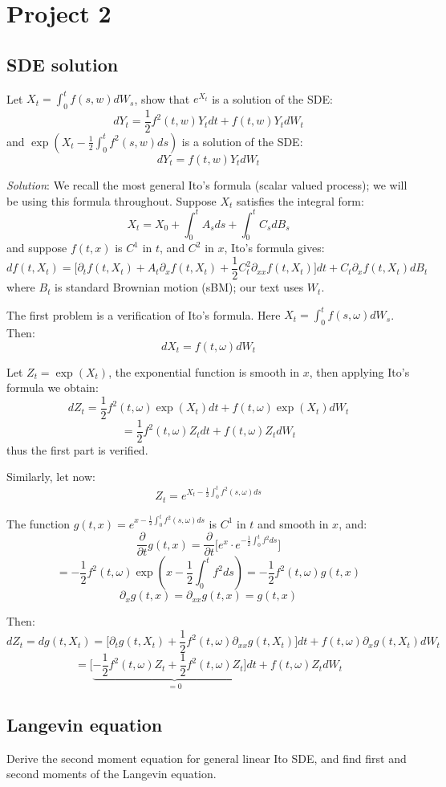 \documentclass{article}
\begin{document}
\section{Project 2}
\subsection{SDE solution} Let $X_t = \int_0^tf(s,w)dW_s$, show that $e^{X_t}$ is a solution of the SDE:
$$
    dY_t = \frac12f^2(t,w)Y_tdt + f(t,w)Y_tdW_t
$$ and $\exp(X_t - \frac12\int_0^tf^2(s,w)ds)$ is a solution of the SDE:
$$
    dY_t = f(t,w)Y_tdW_t
$$

\emph{Solution}: We recall the most general Ito's formula (scalar valued process); we will be using this formula throughout. Suppose $X_t$ satisfies the integral form:
$$
    X_t = X_0 + \int_0^tA_sds + \int_0^tC_sdB_s
$$ and suppose $f(t,x)$ is $C^1$ in $t$, and $C^2$ in $x$, Ito's formula gives:
$$
    df(t,X_t) = \bigg[
        \partial_tf(t,X_t) + A_t\partial_xf(t,X_t) + \frac12C_t^2\partial_{xx}f(t,X_t)
    \bigg]dt + C_t\partial_xf(t,X_t)dB_t
$$ where $B_t$ is standard Brownian motion (sBM); our text uses $W_t$.

The first problem is a verification of Ito's formula. Here $X_t = \int_0^tf(s,\omega)dW_s$. Then:
$$
    dX_t = f(t,\omega)dW_t
$$

Let $Z_t = \exp(X_t)$, the exponential function is smooth in $x$, then applying Ito's formula we obtain:
$$
    dZ_t = \frac12f^2(t,\omega)\exp(X_t)dt + f(t,\omega)\exp(X_t)dW_t
$$
$$
    = \frac12f^2(t,\omega)Z_tdt + f(t,\omega)Z_tdW_t
$$ thus the first part is verified.

Similarly, let now:
$$
    Z_t = e^{X_t - \frac12\int_0^tf^2(s,\omega)ds}
$$

The function $g(t,x) = e^{x-\frac12\int_0^tf^2(s,\omega)ds}$ is $C^1$ in $t$ and smooth in $x$, and:
$$
    \frac{\partial}{\partial t}g(t,x) =  \frac{\partial}{\partial t}\bigg[
        e^{x}\cdot e^{-\frac12\int_0^tf^2ds}
    \bigg]
$$
$$
    = -\frac12f^2(t,\omega)\exp(x-\frac12\int_0^tf^2ds) = -\frac12f^2(t,\omega)g(t,x)
$$
$$
    \partial_xg(t,x) = \partial_{xx}g(t,x) = g(t,x)
$$

Then:
$$
    dZ_t = dg(t,X_t) = \bigg[
        \partial_tg(t,X_t) + \frac12f^2(t,\omega)\partial_{xx}g(t,X_t)
    \bigg]dt + f(t,\omega)\partial_xg(t,X_t)dW_t
$$
$$
    = \bigg[
        \underbrace{-\frac12f^2(t,\omega)Z_t + \frac12f^2(t,\omega)Z_t
    \bigg]dt}_{=0} + f(t,\omega)Z_tdW_t
$$

\subsection{Langevin equation} Derive the second moment equation for general linear Ito SDE, and find first and second moments of the Langevin equation.
\end{document}
